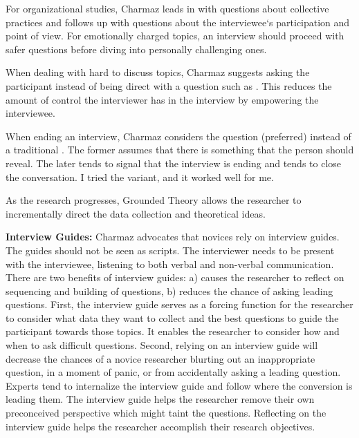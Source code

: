 For organizational studies, Charmaz leads in with questions about collective practices and follows up with questions about the interviewee`s participation and point of view. For emotionally charged topics, an interview should proceed with safer questions before diving into personally challenging ones. 

When dealing with hard to discuss topics, Charmaz suggests asking the participant  instead of being direct with a question such as .  This reduces the amount of control the interviewer has in the interview by empowering the interviewee.

When ending an interview, Charmaz considers the question  (preferred) instead of a traditional . The former assumes that there is something that the person should reveal. The later tends to signal that the interview is ending and tends to close the conversation. I tried the variant,  and it worked well for me.

As the research progresses, Grounded Theory allows the researcher to incrementally direct the data collection and theoretical ideas.

\textbf{Interview Guides:} Charmaz advocates that novices rely on interview guides. The guides should not be seen as scripts. The interviewer needs to be present with the interviewee, listening to both verbal and non-verbal communication. There are two benefits of interview guides: a) causes the researcher to reflect on sequencing and building of questions, b) reduces the chance of asking leading questions. First, the interview guide serves as a forcing function for the researcher to consider what data they want to collect and the best questions to guide the participant towards those topics. It enables the researcher to consider how and when to ask difficult questions. Second, relying on an interview guide will decrease the chances of a novice researcher blurting out an inappropriate question, in a moment of panic, or from accidentally asking a leading question. Experts tend to internalize the interview guide and follow where the conversion is leading them. The interview guide helps the researcher remove their own preconceived perspective which might taint the questions. Reflecting on the interview guide helps the researcher accomplish their research objectives. 

